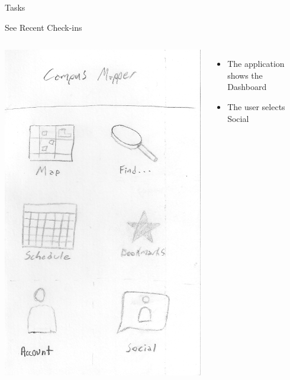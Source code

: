 \documentclass{beamer}
\begin{document}
\begin{frame}{Tasks}
    \begin{block}{}
    \end{block}
\end{frame}

\begin{frame}{See Recent Check-ins}
    \begin{columns}[c]
        \center\includegraphics[height=0.75 \textheight]{hand-drawn/dashboard.png}
        \begin{itemize}
            \item The application shows the Dashboard
            \item The user selects Social
        \end{itemize}
    \end{columns}
\end{frame}
\end{document}
